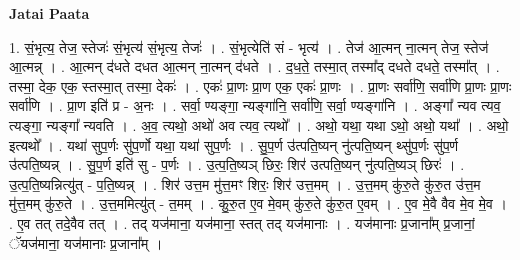 \documentclass[17pt]{extarticle}
\begin{document}
\textbf{Jatai Paata} \newline

1. सं॒भृत्य॒ तेज॒ स्तेजः॑ सं॒भृत्य॑ सं॒भृत्य॒ तेजः॑ । . सं॒भृत्येति॑ सं - भृत्य॑ । . तेज॑ आ॒त्मन् ना॒त्मन् तेज॒ स्तेज॑ आ॒त्मन्न् । . आ॒त्मन् द॑धते दधत आ॒त्मन् ना॒त्मन् द॑धते । . द॒ध॒ते॒ तस्मा॒त् तस्मा᳚द् दधते दधते॒ तस्मा᳚त् । . तस्मा॒ देक॒ एक॒ स्तस्मा॒त् तस्मा॒ देकः॑ । . एकः॑ प्रा॒णः प्रा॒ण एक॒ एकः॑ प्रा॒णः । . प्रा॒णः सर्वा॑णि॒ सर्वा॑णि प्रा॒णः प्रा॒णः सर्वा॑णि । . प्रा॒ण इति॑ प्र - अ॒नः । . सर्वा॒ ण्यङ्गा॒ न्यङ्गा॑नि॒ सर्वा॑णि॒ सर्वा॒ ण्यङ्गा॑नि । . अङ्गा᳚ न्यव त्यव॒ त्यङ्गा॒ न्यङ्गा᳚ न्यवति । . अ॒व॒ त्यथो॒ अथो॑ अव त्यव॒ त्यथो᳚ । . अथो॒ यथा॒ यथा ऽथो॒ अथो॒ यथा᳚ । . अथो॒ इत्यथो᳚ । . यथा॑ सुप॒र्णः सु॑प॒र्णो यथा॒ यथा॑ सुप॒र्णः । . सु॒प॒र्ण उ॑त्पति॒ष्यन् नु॑त्पति॒ष्यन् थ्सु॑प॒र्णः सु॑प॒र्ण उ॑त्पति॒ष्यन्न् । . सु॒प॒र्ण इति॑ सु - प॒र्णः । . उ॒त्प॒ति॒ष्यञ् छिरः॒ शिर॑ उत्पति॒ष्यन् नु॑त्पति॒ष्यञ् छिरः॑ । . उ॒त्प॒ति॒ष्यन्नित्यु॑त् - प॒ति॒ष्यन्न् । . शिर॑ उत्त॒म मु॑त्त॒मꣳ शिरः॒ शिर॑ उत्त॒मम् । . उ॒त्त॒मम् कु॑रु॒ते कु॑रु॒त उ॑त्त॒म मु॑त्त॒मम् कु॑रु॒ते । . उ॒त्त॒ममित्यु॑त् - त॒मम् । . कु॒रु॒त ए॒व मे॒वम् कु॑रु॒ते कु॑रु॒त ए॒वम् । . ए॒व मे॒वै वैव मे॒व मे॒व । . ए॒व तत् तदे॒वैव तत् । . तद् यज॑माना॒ यज॑माना॒ स्तत् तद् यज॑मानाः । . यज॑मानाः प्र॒जाना᳚म् प्र॒जानां॒ ॅयज॑माना॒ यज॑मानाः प्र॒जाना᳚म् । \newline
\end{document}
